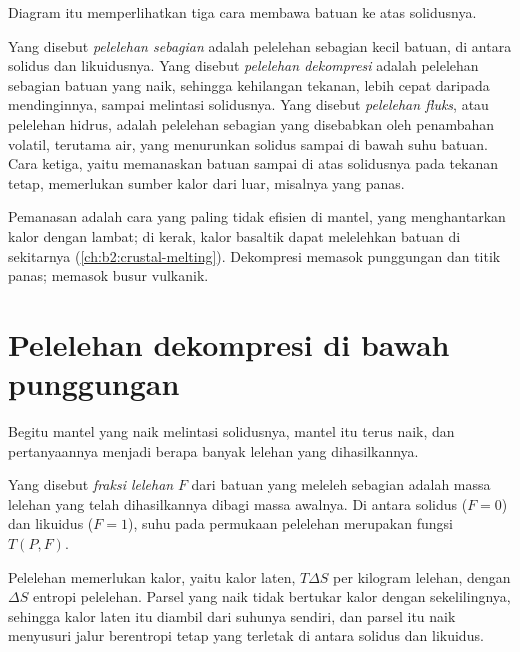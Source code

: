 Diagram itu memperlihatkan tiga cara membawa batuan ke atas solidusnya.

\begin{definition}\label{def:b2:mantle-melting:melting}
Yang disebut \emph{pelelehan sebagian} adalah pelelehan sebagian kecil
batuan, di antara solidus dan likuidusnya. Yang disebut \emph{pelelehan
dekompresi} adalah pelelehan sebagian batuan yang naik,
sehingga kehilangan tekanan, lebih cepat daripada mendinginnya, sampai melintasi solidusnya.
Yang disebut \emph{pelelehan fluks},
atau pelelehan hidrus, adalah pelelehan sebagian yang disebabkan oleh penambahan volatil,
terutama air, yang menurunkan solidus sampai di bawah suhu batuan. Cara
ketiga, yaitu memanaskan batuan sampai di atas solidusnya pada tekanan tetap, memerlukan sumber
kalor dari luar, misalnya  yang panas.
\end{definition}

Pemanasan adalah cara yang paling tidak efisien di mantel, yang menghantarkan kalor dengan lambat; di
kerak, kalor  basaltik dapat melelehkan batuan di sekitarnya
(\cref{ch:b2:crustal-melting}). Dekompresi memasok punggungan dan titik panas;
 memasok busur vulkanik.

\section{Pelelehan dekompresi di bawah punggungan}\label{sec:b2:mantle-melting:decompression}

Begitu mantel yang naik melintasi solidusnya, mantel itu terus naik, dan pertanyaannya
menjadi berapa banyak lelehan yang dihasilkannya.

\begin{definition}\label{def:b2:mantle-melting:fraction}
Yang disebut \emph{fraksi lelehan} $F$ dari batuan yang meleleh sebagian adalah
massa lelehan yang telah dihasilkannya dibagi massa awalnya. Di antara solidus
($F = 0$) dan likuidus ($F = 1$), suhu pada permukaan pelelehan merupakan
fungsi $T(P, F)$.
\end{definition}

Pelelehan memerlukan kalor, yaitu kalor laten, $T\Delta S$ per kilogram lelehan, dengan
$\Delta S$ entropi pelelehan. Parsel yang naik tidak bertukar kalor dengan
sekelilingnya, sehingga kalor laten itu diambil dari suhunya sendiri, dan parsel itu naik
menyusuri jalur berentropi tetap yang terletak di antara solidus dan likuidus.

